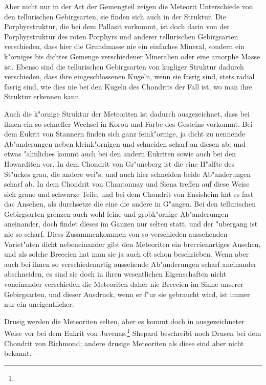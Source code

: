 \documentclass[a4paper, 11pt, oneside]{article}
\begin{document}
Aber nicht nur in der Art der Gemengteil zeigen die Meteorit Unterschiede von den tellurischen Gebirgsarten, sie finden sich auch in der Struktur. Die Porphyrstruktur, die bei dem Pallasit vorkommt, ist doch darin von der Porphyrstruktur des roten Porphyrs und anderer tellurischen Gebirgsarten verschieden, dass hier die Grundmasse nie ein einfaches Mineral, sondern ein k"orniges bis dichtes Gemenge verschiedener Mineralien oder eine amorphe Masse ist. Ebenso sind die tellurischen Gebirgsarten von kugliger Struktur dadurch verschieden, dass ihre eingeschlossenen Kugeln, wenn sie fasrig sind, stets radial fasrig sind, wie dies nie bei den Kugeln des Chondrits der Fall ist, wo man ihre Struktur erkennen kann.

Auch die k"ornige Struktur der Meteoriten ist dadurch ausgezeichnet, dass bei ihnen ein so schneller Wechsel in Korou und Farbe des Gesteins vorkommt. Bei dem Eukrit von Stannern finden sich ganz feink"ornige, ja dicht zu nennende Ab"anderungen neben kleink"ornigen und schneiden scharf an diesen ab; und etwas "ahnliches kommt auch bei den andern Eukriten sowie auch bei den Howarditen vor. In dem Chondrit von Gr"uneberg ist die eine H"alfte des St"uckes grau, die andere wei"s, und auch hier schneiden beide Ab"anderungen scharf ab. In dem Chondrit von Chantonnay und Siena treffen auf diese Weise sich graue und schwarze Teile, und bei dem Chondrit von Ensisheim hat es fast das Ansehen, als durchsetze die eine die andere in G"angen. Bei den tellurischen Gebirgsarten grenzen auch wohl feine und grobk"ornige Ab"anderungen aneinander, doch findet dieses im Ganzen nur selten statt, und der "ubergang ist nie so scharf. Diess Zusammenkommen von so verschieden aussehenden Variet"aten dicht nebeneinander gibt den Meteoriten ein breccienartiges Ansehen, und als solche Breccien hat man sie ja auch oft schon beschrieben. Wenn aber auch bei ihnen so verschiedenartig aussehende Ab"anderungen scharf aneinander abschneiden, es sind sie doch in ihren wesentlichen Eigenschaften nicht voneinander verschieden die Meteoriten daher nie Breccien im Sinne unserer Gebirgsarten, und dieser Ausdruck, wenn er f"ur sie gebraucht wird, ist immer nur ein uneigentlicher.

Drusig werden die Meteoriten selten, aber es kommt doch in ausgezeichneter Weise vor bei dem Eukrit von Juvenas.\footnote{} Shepard beschreibt noch Drusen bei dem Chondrit von Richmond; andere drusige Meteoriten als diese sind aber nicht bekannt. ---
\end{document}
